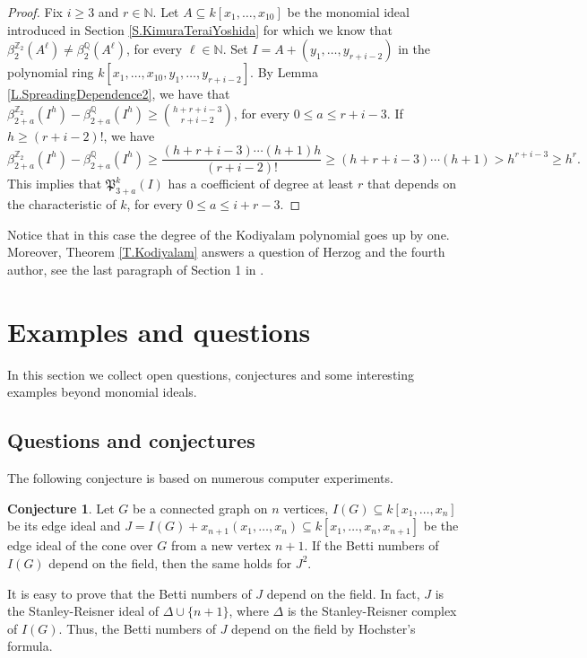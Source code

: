 \documentclass[11pt,oneside]{amsart}
\theoremstyle{plain}
\theoremstyle{definition}
\newtheorem{conjecture}[theorem]{Conjecture}
\newcommand{\Q}{\mathbb{Q}}
\newcommand{\Z}{\mathbb{Z}}
\begin{document}
\begin{proof}
Fix $i \geq 3$ and $r \in \mathbb{N}$. Let $A \subseteq k[x_1,\dots,x_{10}]$ be the monomial ideal introduced in Section \ref{S.KimuraTeraiYoshida} for which we know that $\beta_2^{\mathbb{Z}_2}(A^{\ell}) \neq \beta_2^{\mathbb{Q}}(A^{\ell})$, for every $\ell \in \mathbb{N}$. Set $I=A+(y_1, \dots, y_{r+i-2})$ in the polynomial ring $k[x_1,\dots,x_{10}, y_1, \dots, y_{r+i-2}]$. 
By Lemma \ref{L.SpreadingDependence2}, we have that $\beta^{\mathbb{Z}_2}_{2+a}(I^h)-\beta^{\mathbb Q}_{2+a}(I^h) \geq \binom{h+r+i-3}{r+i-2}$, for every $0 \leq a \leq r+i-3$.
If $h \geq (r+i-2)!$, we have
\[
\beta^{\Z_2}_{2+a}(I^h)-\beta^{\Q}_{2+a}(I^h) \geq 
\frac{(h+r+i-3) \cdots (h+1)h}{(r+i-2)!} \geq (h+r+i-3) \cdots (h+1) > h^{r+i-3} \geq h^{r}.
\]
This implies that $\mathfrak P^k_{3+a}(I)$ has a coefficient of degree at least $r$ that depends on the characteristic of $k$, for every $0 \leq a \leq i+r-3$.
\end{proof}

Notice that in this case the degree of the Kodiyalam polynomial goes up by one. Moreover, Theorem \ref{T.Kodiyalam} answers a question of Herzog and the fourth author, see the last paragraph of Section 1 in \cite{HW11}.

\section{Examples and questions}

In this section we collect open questions, conjectures and some interesting examples beyond monomial ideals.

\subsection{Questions and conjectures}

The following conjecture is based on numerous computer experiments.

\begin{conjecture}\label{C.coneEdgeIdeals}
Let $G$ be a connected graph on $n$ vertices, $I(G) \subseteq k[x_1,\dots,x_n]$ be its edge ideal and $J = I(G) + x_{n+1}(x_1,\dots,x_n) \subseteq k[x_1,\dots,x_n,x_{n+1}]$ be the edge ideal of the cone over $G$ from a new vertex $n+1$. If the Betti numbers of $I(G)$ depend on the field, then the same holds for $J^2$.
\end{conjecture}

It is easy to prove that the Betti numbers of $J$ depend on the field. In fact, $J$ is the Stanley-Reisner ideal of $\Delta \cup \{n+1\}$, where $\Delta$ is the Stanley-Reisner complex of $I(G)$. Thus, the Betti numbers of $J$ depend on the field by Hochster's formula.
\end{document}

